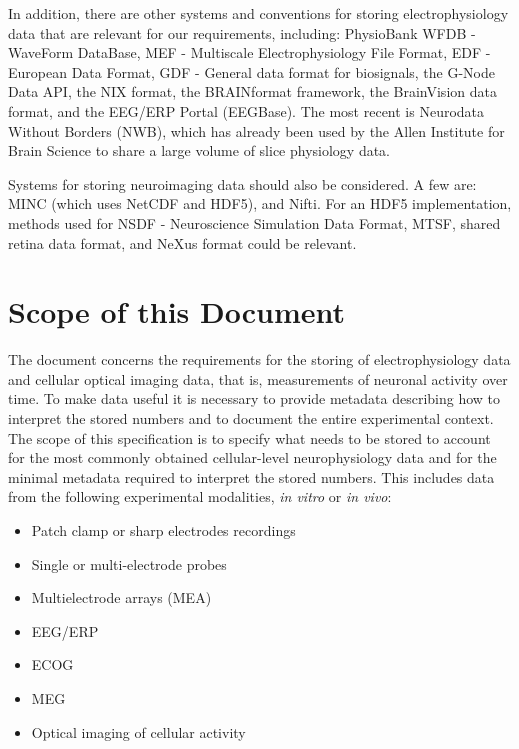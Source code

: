 \documentclass[letterpaper, 10 pt, conference]{ieeeconf}  \IEEEoverridecommandlockouts                              \overrideIEEEmargins
\begin{document}
In addition, there are other systems and conventions for storing  electrophysiology data that are relevant for our requirements, including: PhysioBank WFDB - WaveForm DataBase\cite{wfdb}, MEF - Multiscale Electrophysiology File Format\cite{mef}, EDF - European Data Format\cite{edf}, GDF - General data format for biosignals\cite{gdf}, the G-Node Data API\cite{g-node}, the NIX format\cite{nix}, the BRAINformat framework\cite{brainformat}, the BrainVision data format\cite{brainvision}, and the EEG/ERP Portal (EEGBase)\cite{eegbase}. 
The most recent is Neurodata Without Borders (NWB)\cite{nwb}, which has already been used by the Allen Institute for Brain Science to share a large volume of slice physiology data.

Systems for storing neuroimaging data should also be considered.  
A few are: MINC\cite{minc} (which uses NetCDF and HDF5), and Nifti\cite{nifti}.  
For an HDF5 implementation, methods used for NSDF - Neuroscience Simulation Data Format\cite{nsdf}, MTSF\cite{pfeiffer}, shared retina data format\cite{eglen}, and NeXus format could be relevant\cite{nexus}.

\medskip
\section{\textbf{Scope of this Document}}
The document concerns the requirements for the storing of electrophysiology data and cellular optical imaging data, that is, measurements of neuronal activity over time.  
To make data useful it is necessary to provide metadata describing how to interpret the stored numbers and to document the entire experimental context. 
The scope of this specification is to specify what needs to be stored to account for the most commonly obtained cellular-level neurophysiology data and for the minimal metadata required to interpret the stored numbers.  
This includes data from the following experimental modalities, \textit{in vitro} or \textit{in vivo}:

\begin{itemize}
\item Patch clamp or sharp electrodes recordings
\item Single or multi-electrode probes
\item Multielectrode arrays (MEA)
\item EEG/ERP
\item ECOG
\item MEG
\item Optical imaging of cellular activity
\end{itemize}
\end{document}
